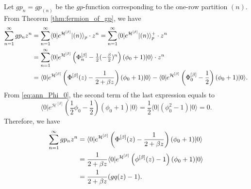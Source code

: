 \documentclass{amsart}
\def\ket#1{\vert #1 \rangle}
\def\bra#1{\langle #1 \vert}
\begin{document}
Let $gp_n=gp_{(n)}$ be the $gp$-function corresponding to the one-row partition $(n)$.
From Theorem \ref{thm:fermion_of_gp}, we have
\begin{align*}
\sum_{n=1}^\infty gp_nz^n
&=\sum_{n=1}^\infty \bra{0}e^{\mathcal{H}^{[\beta]}}\ket{(n)}_p\cdot z^n
=\sum_{n=1}^\infty
\bra{0}e^{\mathcal{H}^{[\beta]}}\ket{(n)}^+_p\cdot z^n\\
&=\sum_{n=1}^\infty\bra{0}e^{\mathcal{H}^{[\beta]}}\left(\Phi^{[\beta]}_{n}-\tfrac{1}{2}(-\tfrac{\beta}{2})^{n}\right)
(\phi_0+1)\ket{0}\cdot z^n\allowdisplaybreaks\\
&=
\bra{0}e^{\mathcal{H}^{[\beta]}}\left(\Phi^{[\beta]}(z)-\frac{1}{2+\beta z}\right)
(\phi_0+1)\ket{0}
-
\bra{0}e^{\mathcal{H}^{[\beta]}}\left(\Phi^{[\beta]}_0-\frac{1}{2}\right)
(\phi_0+1)\ket{0}.
\end{align*}
From \eqref{eq:ann_Phi_0}, the second term of the last expression equals to
\[
\bra{0}e^{\mathcal{H}^{[\beta]}}\left(\frac{1}{2}\phi_0-\frac{1}{2}\right)
(\phi_0+1)\ket{0}
=
\frac{1}{2}
\bra{0}(\phi_0^2-1)\ket{0}=0.
\]
Therefore, we have
\begin{align*}
\sum_{n=1}^\infty gp_nz^n
&=
\bra{0}e^{\mathcal{H}^{[\beta]}}\left(\Phi^{[\beta]}(z)-\frac{1}{2+\beta z}\right)
(\phi_0+1)\ket{0}\allowdisplaybreaks\\
&=\frac{1}{2+\beta z}
\bra{0}e^{\mathcal{H}^{[\beta]}}
\left(
\phi^{[\beta]}(z)-1
\right)(\phi_0+1)\ket{0}\allowdisplaybreaks\\
&=\frac{1}{2+\beta z}(gq(z)-1).
\end{align*}
\end{document}
